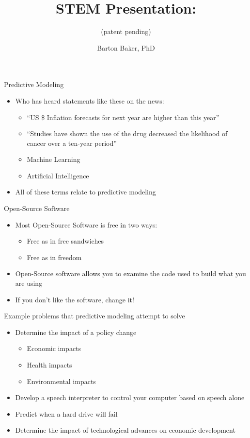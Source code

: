 \documentclass[10pt]{beamer}
\title{STEM Presentation: }
\subtitle{(patent pending)}
\author{Barton Baker, PhD}
\begin{document}
\begin{frame}[t]{Predictive Modeling}
  \begin{itemize}
    \item Who has heard statements like these on the news:
    \begin{itemize}
      \item<2-> ``US \$ Inflation forecasts for next year are higher than this
        year''
      \item<3-> ``Studies have shown the use of the drug decreased the
        likelihood of cancer over a ten-year period''
      \item<4-> Machine Learning
      \item<5-> Artificial Intelligence
    \end{itemize}
    \item<6-> All of these terms relate to predictive modeling
  \end{itemize}
\end{frame}

\begin{frame}[t]{Open-Source Software}
  \begin{itemize}
    \item Most Open-Source Software is free in two ways:
    \begin{itemize}
      \item Free as in free sandwiches
      \item Free as in freedom
    \end{itemize}
    \item Open-Source software allows you to examine the code used to build
      what you are using
    \item If you don't like the software, change it!
  \end{itemize}
\end{frame}

\begin{frame}[t]{Example problems that predictive modeling attempt to solve}
  \begin{itemize}
    \item Determine the impact of a policy change
      \begin{itemize}
        \item Economic impacts
        \item Health impacts
        \item Environmental impacts
      \end{itemize}
    \item Develop a speech interpreter to control your computer based on speech
      alone
    \item Predict when a hard drive will fail
    \item Determine the impact of technological advances on economic
      development
  \end{itemize}

\end{frame}
\end{document}
